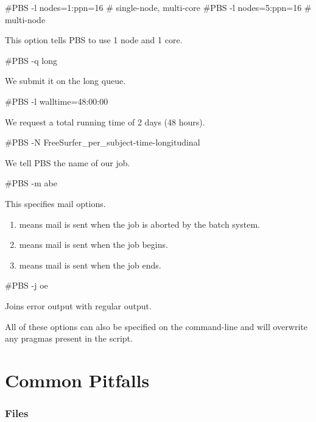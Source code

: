 \begin{prompt}
  #PBS -l nodes=1:ppn=16  # single-node, multi-core
  #PBS -l nodes=5:ppn=16  # multi-node
\end{prompt}

This option tells PBS to use 1 node and 1 core.

\begin{prompt}
  #PBS -q long
\end{prompt}

We submit it on the long queue.

\begin{prompt}
  #PBS -l walltime=48:00:00
\end{prompt}

We request a total running time of 2 days (48 hours).

\begin{prompt}
  #PBS -N FreeSurfer_per_subject-time-longitudinal
\end{prompt}

We tell PBS the name of our job.

\begin{prompt}
  #PBS -m abe
\end{prompt}

This specifies mail options. 
\begin{enumerate}
\item {} means mail is sent when the job is aborted by the batch system.
\item {} means mail is sent when the job begins.
\item {} means mail is sent when the job ends.
\end{enumerate}

\begin{prompt}
  #PBS -j oe
\end{prompt}

Joins error output with regular output.

All of these options can also be specified on the command-line and will
overwrite any pragmas present in the script.

\chapter{Common Pitfalls}

\subsection{Files}

